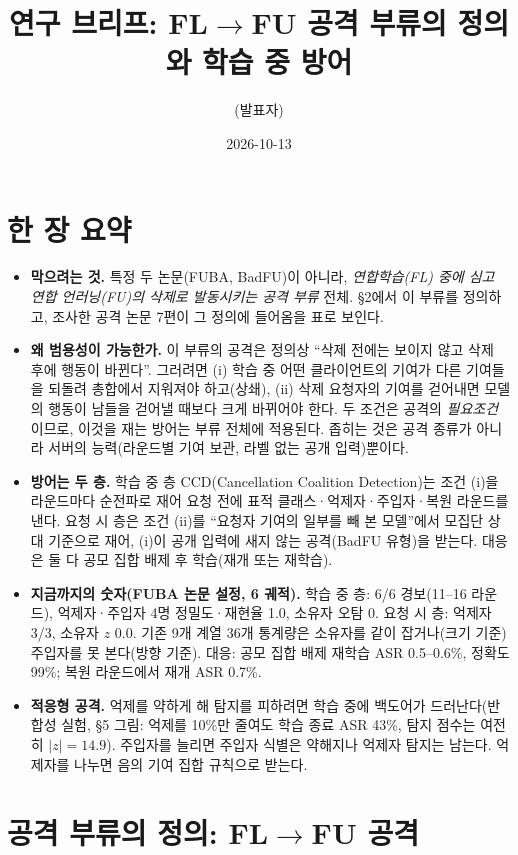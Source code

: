 \documentclass[10pt,a4paper]{article}
\title{\vspace{-8mm}연구 브리프: FL$\to$FU 공격 부류의 정의와 학습 중 방어}
\author{(발표자)}
\date{2026-10-13}
\newcommand{\method}{CCD}
\begin{document}
\maketitle
\vspace{-6mm}

\section{한 장 요약}
\begin{itemize}
\item \textbf{막으려는 것.} 특정 두 논문(FUBA, BadFU)이 아니라, \emph{연합학습(FL) 중에 심고 연합 언러닝(FU)의 삭제로 발동시키는 공격 부류} 전체. \S2에서 이 부류를 정의하고, 조사한 공격 논문 7편이 그 정의에 들어옴을 표로 보인다.
\item \textbf{왜 범용성이 가능한가.} 이 부류의 공격은 정의상 ``삭제 전에는 보이지 않고 삭제 후에 행동이 바뀐다''. 그러려면 (i) 학습 중 어떤 클라이언트의 기여가 다른 기여들을 되돌려 총합에서 지워져야 하고(상쇄), (ii) 삭제 요청자의 기여를 걷어내면 모델의 행동이 남들을 걷어낼 때보다 크게 바뀌어야 한다. 두 조건은 공격의 \emph{필요조건}이므로, 이것을 재는 방어는 부류 전체에 적용된다. 좁히는 것은 공격 종류가 아니라 서버의 능력(라운드별 기여 보관, 라벨 없는 공개 입력)뿐이다.
\item \textbf{방어는 두 층.} 학습 중 층 \method{}(Cancellation Coalition Detection)는 조건 (i)을 라운드마다 순전파로 재어 요청 전에 표적 클래스·억제자·주입자·복원 라운드를 낸다. 요청 시 층은 조건 (ii)를 ``요청자 기여의 일부를 빼 본 모델''에서 모집단 상대 기준으로 재어, (i)이 공개 입력에 새지 않는 공격(BadFU 유형)을 받는다. 대응은 둘 다 공모 집합 배제 후 학습(재개 또는 재학습).
\item \textbf{지금까지의 숫자(FUBA 논문 설정, 6 궤적).} 학습 중 층: 6/6 경보(11--16 라운드), 억제자·주입자 4명 정밀도·재현율 1.0, 소유자 오탐 0. 요청 시 층: 억제자 3/3, 소유자 $z$ 0.0. 기존 9개 계열 36개 통계량은 소유자를 같이 잡거나(크기 기준) 주입자를 못 본다(방향 기준). 대응: 공모 집합 배제 재학습 ASR 0.5--0.6\%, 정확도 99\%; 복원 라운드에서 재개 ASR 0.7\%.
\item \textbf{적응형 공격.} 억제를 약하게 해 탐지를 피하려면 학습 중에 백도어가 드러난다(반합성 실험, \S5 그림: 억제를 10\%만 줄여도 학습 종료 ASR 43\%, 탐지 점수는 여전히 $|z|=14.9$). 주입자를 늘리면 주입자 식별은 약해지나 억제자 탐지는 남는다. 억제자를 나누면 음의 기여 집합 규칙으로 받는다.
\end{itemize}

\section{공격 부류의 정의: FL$\to$FU 공격}
\end{document}
